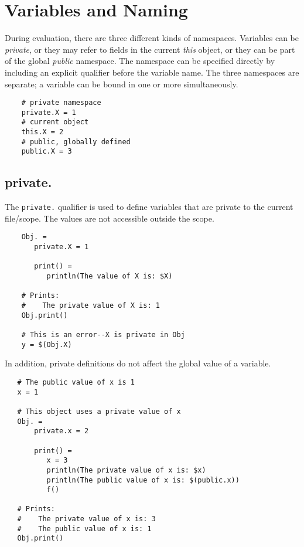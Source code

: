 %
\chapter{Variables and Naming}
\label{chapter:naming}

During evaluation, there are three different kinds of namespaces.  Variables can be \emph{private},
or they may refer to fields in the current \emph{this} object, or they can be part of the global
\emph{public} namespace.  The namespace can be specified directly by including an explicit qualifier
before the variable name.  The three namespaces are separate; a variable can be bound in one or more
simultaneously.

\begin{verbatim}
    # private namespace
    private.X = 1
    # current object
    this.X = 2
    # public, globally defined
    public.X = 3
\end{verbatim}

\section{private.}
\label{section:private}

The \verb+private.+ qualifier is used to define variables that are private to the current file/scope.
The values are not accessible outside the scope.

\begin{verbatim}
    Obj. =
       private.X = 1

       print() =
          println(The value of X is: $X)

    # Prints:
    #    The private value of X is: 1
    Obj.print()

    # This is an error--X is private in Obj
    y = $(Obj.X)
\end{verbatim}

In addition, private definitions do not affect the global value of a variable.

\begin{verbatim}
   # The public value of x is 1
   x = 1

   # This object uses a private value of x
   Obj. =
       private.x = 2

       print() =
          x = 3
          println(The private value of x is: $x)
          println(The public value of x is: $(public.x))
          f()

   # Prints:
   #    The private value of x is: 3
   #    The public value of x is: 1
   Obj.print()
\end{verbatim}

